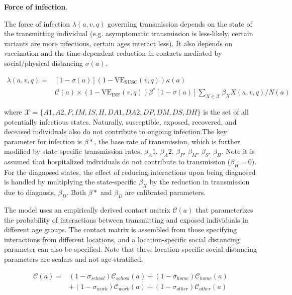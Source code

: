 \documentclass[11pt]{article}
\begin{document}
{\bf Force of infection}. 

The force of infection $\lambda(a,v,q)$ governing transmission depends on the state of the transmitting individual (e.g. asymptomatic transmission is less-likely, certain variants are more infectious, certain ages interact less). It also depends on vaccination and the time-dependent reduction in contacts mediated by social/physical distancing $\sigma(a)$. 

\begin{equation}
\begin{split}
\lambda(a,v,q)  = & [1-\sigma(a)] (1-\mathrm{VE_{SUSC}}(v,q))\kappa(a) \\
	&\mathcal{C}(a) \times (1-\mathrm{VE_{INF}}(v,q)) \beta^* [1-\sigma(a)] \sum_{X\in\mathcal{X}}  \beta_X X(a,v,q)  / N(a)
\end{split}
\end{equation}

where $\mathcal{X}=\{A1, A2, P, IM, IS, H, DA1, DA2, DP, DM, DS, DH\}$ is the set of all potentially infectious states. Naturally, susceptible, exposed, recovered, and deceased individuals also do not contribute to ongoing infection.The key parameter for infection is $\beta*$, the base rate of transmission, which is further modified by state-specific transmission rates, $\beta_A1$, $\beta_A2$, $\beta_P$, $\beta_M$, $\beta_S$, $\beta_H$. Note it is assumed that hospitalized individuals do not contribute to transmission ($\beta_H=0$). For the diagnosed states, the effect of reducing interactions upon being diagnosed is handled by multiplying the state-specific $\beta_X$ by the reduction in transmission due to diagnosis, $\beta_D$. Both  $\beta*$ and $\beta_D$ are calibrated parameters.

The model uses an empirically derived contact matrix $\mathcal{C}(a)$ that parameterizes the probability of interactions between transmitting and exposed individuals in different age groups. The contact matrix is assembled from those specifying interactions from different locations, and a location-specific social distancing parameter can also be specified. Note that these location-specific social distancing parameters are scalars and not age-stratified.

\begin{equation}
\begin{split}
\mathcal{C}(a) = &(1 - \sigma_{school} )\mathcal{C}_{school}(a) + (1 - \sigma_{home}) \mathcal{C}_{home}(a) \\
&+ (1 - \sigma_{work}) \mathcal{C}_{work}(a) + (1 - \sigma_{other}) \mathcal{C}_{other}(a)
\end{split}
\end{equation}
\end{document}
